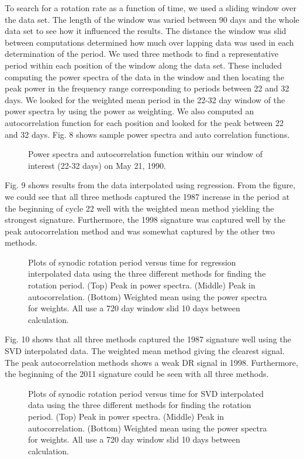 \documentclass[preprint2]{aastex}
\begin{document}
To search for a rotation rate as a function of time, we used a sliding window over the data set. The length of the window was varied between 90 days and the whole data set to see how it influenced the results. The distance the window was slid between computations determined how much over lapping data was used in each determination of the period. We used three methods to find a representative period within each position of the window along the data set. These included computing the power spectra of the data in the window and then locating the peak power in the frequency range corresponding to periods between 22 and 32 days. We looked for the weighted mean period in the 22-32 day window of the power spectra by using the power as weighting. We also computed an autocorrelation function for each position and looked for the peak between 22 and 32 days. Fig. 8 shows sample power spectra and auto correlation functions.

\begin{figure}[H]
\caption{Power spectra and autocorrelation function within our window of interest (22-32 days) on May 21, 1990.}
\end{figure}

Fig. 9 shows results from the data interpolated using regression. From the figure, we could see that all three methods captured the 1987 increase in the period at the beginning of cycle 22 well with the weighted mean method yielding the strongest signature. Furthermore, the 1998 signature was captured well by the peak autocorrelation method and was somewhat captured by the other two methods.

\begin{figure}[H]
\caption{Plots of synodic rotation period versus time for regression interpolated data using the three different methods for finding the rotation period. (Top) Peak in power spectra. (Middle) Peak in autocorrelation. (Bottom) Weighted mean using the power spectra for weights. All use a 720 day window slid 10 days between calculation.}
\end{figure}

Fig. 10 shows that all three methods captured the 1987 signature well using the SVD interpolated data. The weighted mean method giving the clearest signal. The peak autocorrelation methods shows a weak DR signal in 1998. Furthermore, the beginning of the 2011 signature could be seen with all three methods.

\begin{figure}[H]
\caption{Plots of synodic rotation period versus time for SVD interpolated data using the three different methods for finding the rotation period. (Top) Peak in power spectra. (Middle) Peak in autocorrelation. (Bottom) Weighted mean using the power spectra for weights. All use a 720 day window slid 10 days between calculation.}
\end{figure}
\end{document}

